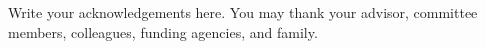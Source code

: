 Write your acknowledgements here. You may thank your advisor, committee members, colleagues, funding agencies, and family.

